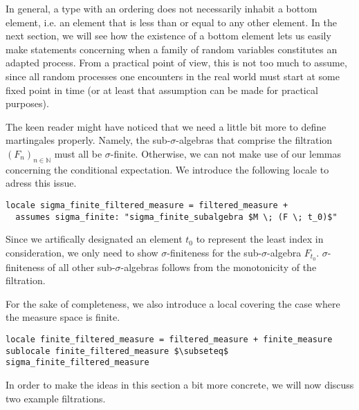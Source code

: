 In general, a type with an ordering does not necessarily inhabit a bottom element, i.e. an element that is less than or equal to any other element. In the next section, we will see how the existence of a bottom element lets us easily make statements concerning when a family of random variables constitutes an adapted process. From a practical point of view, this is not too much to assume, since all random processes one encounters in the real world must start at some fixed point in time (or at least that assumption can be made for practical purposes).

The keen reader might have noticed that we need a little bit more to define martingales properly. Namely, the sub-$\sigma$-algebras that comprise the filtration $(F_n)_{n \in \mathbb{N}}$ must all be $\sigma$-finite. Otherwise, we can not make use of our lemmas concerning the conditional expectation. We introduce the following locale to adress this issue.

\begin{isadefinition}
{\small
\begin{lstlisting}[style=isabelle]
locale sigma_finite_filtered_measure = filtered_measure +
  assumes sigma_finite: "sigma_finite_subalgebra $M \; (F \; t_0)$"
  \end{lstlisting}
}
\end{isadefinition}

\begin{remark}
	Since we artifically designated an element $t_0$ to represent the least index in consideration, we only need to show $\sigma$-finiteness for the sub-$\sigma$-algebra $F_{t_0}$. $\sigma$-finiteness of all other sub-$\sigma$-algebras follows from the monotonicity of the filtration.
\end{remark}

For the sake of completeness, we also introduce a local covering the case where the measure space is finite.

\begin{isadefinition}
{\small
\begin{lstlisting}[style=isabelle]
locale finite_filtered_measure = filtered_measure + finite_measure
sublocale finite_filtered_measure $\subseteq$ sigma_finite_filtered_measure 

  \end{lstlisting}
}
\end{isadefinition}


In order to make the ideas in this section a bit more concrete, we will now discuss two example filtrations. 

